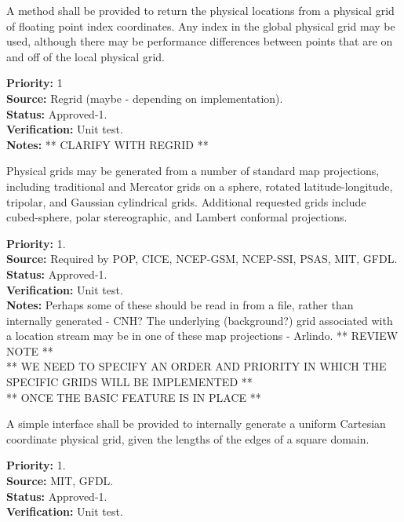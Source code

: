 A method shall be provided to return the physical locations from a physical grid of
floating point index coordinates.  Any index in the global physical grid may be
used, although there may be performance differences between points that are on
and off of the local physical grid.
\begin{reqlist}
{\bf Priority:} 1\\
{\bf Source:} Regrid (maybe - depending on implementation). \\
{\bf Status:} Approved-1. \\
{\bf Verification:} Unit test. \\
{\bf Notes:} ** CLARIFY WITH REGRID **
\end{reqlist}


Physical grids may be generated from a number of standard map projections, including
traditional and Mercator grids on a sphere, rotated latitude-longitude,
tripolar, and Gaussian cylindrical grids.  Additional requested grids include 
cubed-sphere, polar stereographic, and Lambert conformal projections.
\begin{reqlist}
{\bf Priority:} 1. \\
{\bf Source:} Required by POP, CICE, NCEP-GSM, NCEP-SSI,
PSAS, MIT, GFDL. \\
{\bf Status:} Approved-1. \\
{\bf Verification:} Unit test.\\
{\bf Notes:}  Perhaps some of these should be read in from a file, rather than
internally generated - CNH?  The underlying (background?) grid associated with a location stream may be in one of these map projections - Arlindo.
** REVIEW NOTE ** \\
** WE NEED TO SPECIFY AN ORDER AND PRIORITY IN WHICH THE SPECIFIC GRIDS WILL BE IMPLEMENTED ** \\
** ONCE THE BASIC FEATURE IS IN PLACE                                                       ** \\
\end{reqlist}

A simple interface shall be provided to internally generate a uniform Cartesian
coordinate physical grid, given the lengths of the edges of a square domain.
\begin{reqlist}
{\bf Priority:} 1. \\
{\bf Source:} MIT, GFDL. \\
{\bf Status:} Approved-1. \\
{\bf Verification:} Unit test. 
\end{reqlist}

